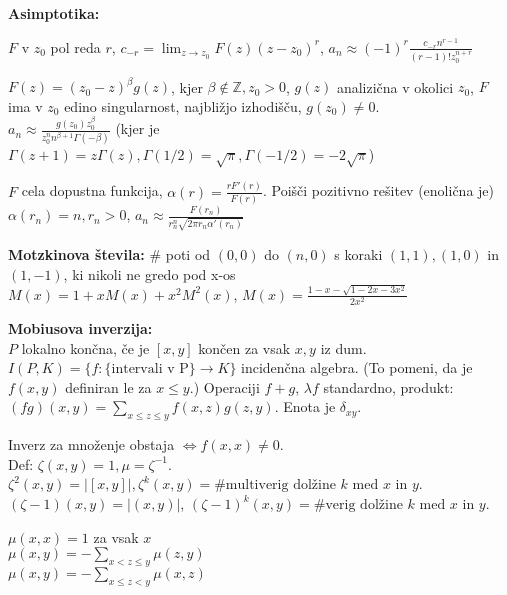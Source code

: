 \documentclass[a4paper, oneside, 12pt]{article}
\theoremstyle{definition}
\def\Z{\mathbb{Z}}
\newenvironment{itemize*}{\vspace{-10pt}\begin{itemize}\setlength{\itemsep}{0pt}\setlength{\parskip}{2pt}}{\end{itemize}}
\begin{document}
\textbf{Asimptotika:}
\begin{itemize*}
    \item $F$ v $z_0$ pol reda $r$, $c_{-r} = \lim_{z \to z_0} F(z)(z-z_0)^r$,
    $a_n \approx (-1)^r \frac{c_{-r} n^{r-1}}{(r-1)! z_0^{n+r}}$
    \item $F(z) = (z_0 - z)^{\beta} g(z)$, kjer $\beta \notin \Z, z_0 >0$, $g(z)$ analizična v okolici $z_0$, $F$ ima v $z_0$ edino singularnost, najbližjo izhodišču, $g(z_0) \neq 0$.\\
    $a_n \approx \frac{g(z_0) z_0^{\beta}}{z_0^n n^{\beta + 1} \Gamma(-\beta)}$ (kjer je $\Gamma(z+1) = z \Gamma(z), \Gamma(1/2)= \sqrt{\pi}, \Gamma(-1/2) = -2 \sqrt{\pi}$)
    \item $F$ cela dopustna funkcija, $\alpha(r) = \frac{r F'(r)}{F(r)}$. Poišči pozitivno rešitev (enolična je) $\alpha(r_n) = n, r_n >0$,
    $a_n \approx \frac{F(r_n)}{r_n^n \sqrt{2 \pi r_n \alpha'(r_n)}}$
\end{itemize*}

\textbf{Motzkinova števila:} \# poti od $(0,0)$ do $(n,0)$ s koraki $(1,1), (1,0)$ in $(1, -1)$, ki nikoli ne gredo pod x-os\\
$M(x) = 1 + x M(x) + x^2 M^2(x)$, $M(x) = \frac{1 - x - \sqrt{1 - 2x - 3x^2}}{2x^2}$

\textbf{Mobiusova inverzija:} \\
$P$ lokalno končna, če je $[x, y]$ končen za vsak $x, y$ iz dum. \\
$I(P, K) = \{ f\colon \{\text{intervali v P} \} \to K\}$ incidenčna algebra.
(To pomeni, da je $f(x, y)$ definiran le za $x \leq y$.)
Operaciji $f+g$, $\lambda f$ standardno, produkt:
$(fg)(x, y) = \sum_{x\leq z \leq y}f(x, z)g(z, y)$. Enota je $\delta_{xy}$.

Inverz za množenje obstaja $\iff f(x, x) \neq 0$. \\
Def: $\zeta(x, y) = 1, \mu = \zeta^{-1}$. $\zeta^2(x, y) = |[x, y]|, \zeta^k(x, y) =
\# \text{multiverig dolžine $k$ med $x$ in $y$}$. $(\zeta-1)(x, y) = |(x, y)|$, $(\zeta-1)^k(x, y)
= \# \text{verig dolžine $k$ med $x$ in $y$}$.

$\mu(x,x) = 1$ za vsak $x$\\
$\mu(x,y) = - \sum_{x < z \leq y} \mu(z,y)$\\
$\mu(x,y) = - \sum_{x \leq z < y} \mu(x,z)$
\end{document}
